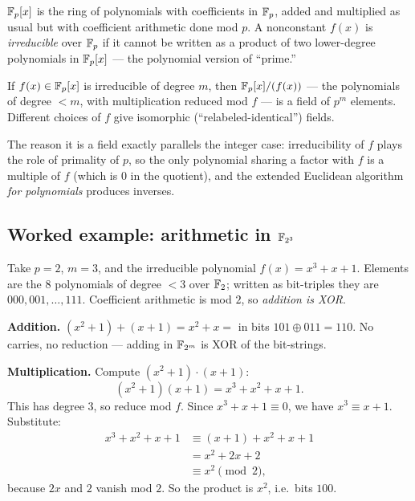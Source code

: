 \begin{definition}
\label{ch41:def-poly}
$\mathbb{F}_p[x]$ is the ring of polynomials with coefficients in $\mathbb{F}_p$, added and
multiplied as usual but with coefficient arithmetic done mod $p$. A nonconstant
$f(x)$ is \emph{irreducible} over $\mathbb{F}_p$ if it cannot be written as a product of
two lower-degree polynomials in $\mathbb{F}_p[x]$ --- the polynomial version of ``prime.''
\end{definition}

\begin{theorem}[Construction of $\F_{p^m}$]
\label{ch41:thm-gf}
If $f(x)\in\mathbb{F}_p[x]$ is irreducible of degree $m$, then $\mathbb{F}_p[x]/(f(x))$ --- the
polynomials of degree $<m$, with multiplication reduced mod $f$ --- is a field of
$p^m$ elements. Different choices of $f$ give isomorphic (``relabeled-identical'')
fields.
\end{theorem}

The reason it is a field exactly parallels the integer case: irreducibility of $f$
plays the role of primality of $p$, so the only polynomial sharing a factor with
$f$ is a multiple of $f$ (which is $0$ in the quotient), and the extended Euclidean
algorithm \emph{for polynomials} produces inverses.

\subsection{Worked example: arithmetic in $\mathbb{F}_{2^3}$}
\label{ch41:ex-gf8}

Take $p=2$, $m=3$, and the irreducible polynomial $f(x)=x^3+x+1$. Elements are the
$8$ polynomials of degree $<3$ over $\mathbb{F}_2$; written as bit-triples they are
$000,001,\dots,111$. Coefficient arithmetic is mod $2$, so \emph{addition is XOR}.

\textbf{Addition.} $(x^2+1)+(x+1) = x^2+x = $ in bits $101 \oplus 011 = 110$. No
carries, no reduction --- adding in $\mathbb{F}_{2^m}$ is XOR of the bit-strings.

\textbf{Multiplication.} Compute $(x^2+1)\cdot(x+1)$:
\[
(x^2+1)(x+1) = x^3 + x^2 + x + 1.
\]
This has degree $3$, so reduce mod $f$. Since $x^3+x+1\equiv 0$, we have
$x^3 \equiv x+1$. Substitute:
\begin{align*}
x^3 + x^2 + x + 1 &\equiv (x+1) + x^2 + x + 1 \\
                  &= x^2 + 2x + 2 \\
                  &\equiv x^2 \pmod{2},
\end{align*}
because $2x$ and $2$ vanish mod $2$. So the product is $x^2$, i.e.\ bits $100$.

